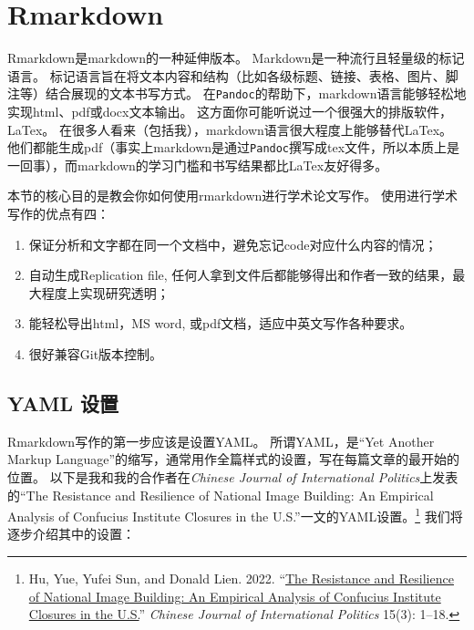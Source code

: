 \documentclass[
  letterpaper,
  DIV=11,
  numbers=noendperiod,
  oneside]{scrreprt}
\providecommand{\tightlist}{%
  \setlength{\itemsep}{0pt}\setlength{\parskip}{0pt}}\usepackage{longtable,booktabs,array}
\begin{document}

\hypertarget{sec-rmarkdown}{%
\chapter{Rmarkdown}\label{sec-rmarkdown}}

Rmarkdown是markdown的一种延伸版本。
Markdown是一种流行且轻量级的标记语言。
标记语言旨在将文本内容和结构（比如各级标题、链接、表格、图片、脚注等）结合展现的文本书写方式。
在\texttt{Pandoc}的帮助下，markdown语言能够轻松地实现html、pdf或docx文本输出。
这方面你可能听说过一个很强大的排版软件，LaTex。
在很多人看来（包括我），markdown语言很大程度上能够替代LaTex。
他们都能生成pdf（事实上markdown是通过\texttt{Pandoc}撰写成tex文件，所以本质上是一回事），而markdown的学习门槛和书写结果都比LaTex友好得多。

本节的核心目的是教会你如何使用rmarkdown进行学术论文写作。
使用进行学术写作的优点有四：

\begin{enumerate}
\def\labelenumi{\arabic{enumi}.}
\tightlist
\item
  保证分析和文字都在同一个文档中，避免忘记code对应什么内容的情况；
\item
  自动生成Replication file,
  任何人拿到文件后都能够得出和作者一致的结果，最大程度上实现研究透明；
\item
  能轻松导出html，MS word, 或pdf文档，适应中英文写作各种要求。
\item
  很好兼容Git版本控制。
\end{enumerate}

\hypertarget{yaml-ux8bbeux7f6e}{%
\section{YAML 设置}\label{yaml-ux8bbeux7f6e}}

Rmarkdown写作的第一步应该是设置YAML。 所谓YAML，是``Yet Another Markup
Language''的缩写，通常用作全篇样式的设置，写在每篇文章的最开始的位置。
以下是我和我的合作者在\emph{Chinese Journal of International
Politics}上发表的``The Resistance and Resilience of National Image
Building: An Empirical Analysis of Confucius Institute Closures in the
U.S.''一文的YAML设置。\footnote{ Hu, Yue, Yufei Sun, and Donald Lien.
  2022. ``\href{https://10.1093/cjip/poac010}{The Resistance and
  Resilience of National Image Building: An Empirical Analysis of
  Confucius Institute Closures in the U.S.}'' \emph{Chinese Journal of
  International Politics} 15(3): 1--18.} 我们将逐步介绍其中的设置：
\end{document}

